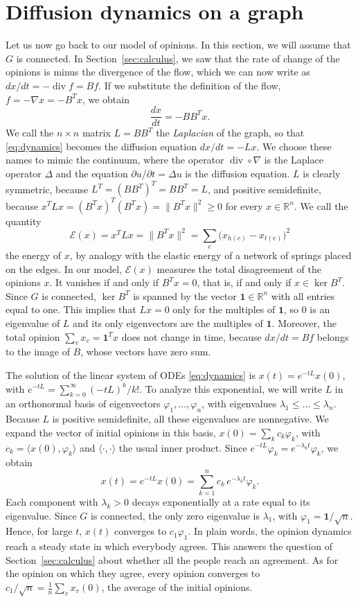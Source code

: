 \documentclass[11pt,a4paper]{article}
\theoremstyle{plain}
\theoremstyle{definition}
\newcommand{\R}{\mathbb{R}}
\begin{document}
\section{Diffusion dynamics on a graph}\label{sec:diffusion}

Let us now go back to our model of opinions. In this section, we will assume that $G$ is connected. In Section~\ref{sec:calculus}, we saw that the rate of change of the opinions is minus the divergence of the flow, which we can now write as $dx/dt=-\operatorname{div}f=Bf$. If we substitute the definition of the flow, $f=-\nabla x=-B^Tx$, we obtain
\begin{equation}\label{eq:dynamics}
\frac{dx}{dt}=-BB^Tx.
\end{equation}
We call the $n\times n$ matrix $L=BB^T$ the \emph{Laplacian} of the graph, so that \eqref{eq:dynamics} becomes the diffusion equation $dx/dt=-Lx$. We choose these names to mimic the continuum, where the operator $\operatorname{div}\circ\nabla$ is the Laplace operator $\Delta$ and the equation $\partial u/\partial t=\Delta u$ is the diffusion equation. $L$ is clearly symmetric, because $L^T=(BB^T)^T=BB^T=L$, and positive semidefinite, because $x^TLx=(B^Tx)^T(B^Tx)=\|B^Tx\|^2\ge0$ for every $x\in\R^n$. We call the quantity
\[
\mathcal{E}(x)=x^TLx=\|B^Tx\|^2=\sum_{e}\bigl(x_{h(e)}-x_{t(e)}\bigr)^2
\]
the energy of $x$, by analogy with the elastic energy of a network of springs placed on the edges. In our model, $\mathcal{E}(x)$ measures the total disagreement of the opinions $x$. It vanishes if and only if $B^Tx=0$, that is, if and only if $x\in\ker B^T$. Since $G$ is connected, $\ker B^T$ is spanned by the vector $\mathbf 1\in\R^n$ with all entries equal to one. This implies that $Lx=0$ only for the multiples of $\mathbf 1$, so $0$ is an eigenvalue of $L$ and its only eigenvectors are the multiples of $\mathbf 1$. Moreover, the total opinion $\sum_vx_v=\mathbf 1^Tx$ does not change in time, because $dx/dt=Bf$ belongs to the image of $B$, whose vectors have zero sum.

The solution of the linear system of ODEs \eqref{eq:dynamics} is $x(t)=e^{-tL}x(0)$, with $e^{-tL}=\sum_{k=0}^\infty(-tL)^k/k!$. To analyze this exponential, we will write $L$ in an orthonormal basis of eigenvectors $\varphi_1,\dots,\varphi_n$, with eigenvalues $\lambda_1\le\dots\le\lambda_n$. Because $L$ is positive semidefinite, all these eigenvalues are nonnegative. We expand the vector of initial opinions in this basis, $x(0)=\sum_kc_k\varphi_k$, with $c_k=\langle x(0),\varphi_k\rangle$ and $\langle\cdot,\cdot\rangle$ the usual inner product. Since $e^{-tL}\varphi_k=e^{-\lambda_kt}\varphi_k$, we obtain
\[
x(t)=e^{-tL}x(0)=\sum_{k=1}^nc_k\,e^{-\lambda_kt}\varphi_k .
\]
Each component with $\lambda_k>0$ decays exponentially at a rate equal to its eigenvalue. Since $G$ is connected, the only zero eigenvalue is $\lambda_1$, with $\varphi_1=\mathbf 1/\sqrt n$. Hence, for large $t$, $x(t)$ converges to $c_1\varphi_1$. In plain words, the opinion dynamics reach a steady state in which everybody agrees. This answers the question of Section~\ref{sec:calculus} about whether all the people reach an agreement. As for the opinion on which they agree, every opinion converges to $c_1/\sqrt n=\frac1n\sum_vx_v(0)$, the average of the initial opinions. 
\end{document}

